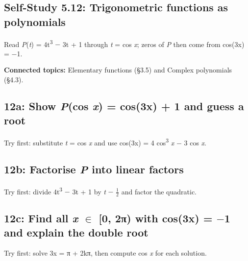 \documentclass[11pt]{article}
\begin{document}
\begin{keepsection}
\section{Self-Study 5.12: Trigonometric functions as polynomials}

Read \textit{P}(\textit{t}) = 4t\textsuperscript{3} \ensuremath{-} 3t + 1 through \textit{t} = cos \textit{x}; zeros of \textit{P} then come from cos(3x) = \ensuremath{-}1.

\textbf{Connected topics:} Elementary functions (§3.5) and Complex polynomials (§4.3).

\begin{keepsection}
\subsection{12a: Show \textit{P}(cos \textit{x}) = cos(3x) + 1 and guess a root}

Try first: substitute \textit{t} = cos \textit{x} and use cos(3x) = 4 cos\textsuperscript{3} \textit{x} \ensuremath{-} 3 cos \textit{x}.

\end{keepsection}

\begin{keepsection}
\subsection{12b: Factorise \textit{P} into linear factors}

Try first: divide 4t\textsuperscript{3} \ensuremath{-} 3t + 1 by \textit{t} \ensuremath{-} \ensuremath{\tfrac12} and factor the quadratic.

\end{keepsection}

\begin{keepsection}
\subsection{12c: Find all \textit{x} \ensuremath{\in} [0, 2π) with cos(3x) = \ensuremath{-}1 and explain the double root}

Try first: solve 3x = π + 2kπ, then compute cos \textit{x} for each solution.

\end{keepsection}
\end{keepsection}
\end{document}
